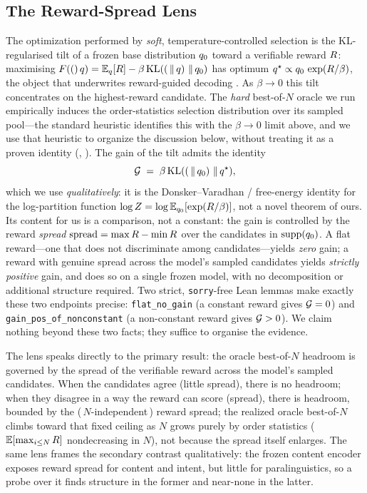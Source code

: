 \subsection{The Reward-Spread Lens}
\label{sec:res:lens}

The optimization performed by \emph{soft}, temperature-controlled selection is the KL-regularised tilt of a frozen base distribution $q_{0}$ toward a verifiable reward $R$: maximising $F\!\left((\right)q)=\mathbb{E}_{q}[R]-\beta\,\mathrm{KL}\!\left(( \,\|\, q\right)\,\|\,q_{0})$ has optimum $q^{\star} \propto q_{0}\,\exp(R/\beta)$, the object that underwrites reward-guided decoding \citep{korbak2022kl,mudgal2024controlled,beirami2024bon}. As $\beta\!\to\!0$ this tilt concentrates on the highest-reward candidate. The \emph{hard} best-of-$N$ oracle we run empirically induces the order-statistics selection distribution over its sampled pool---the standard heuristic identifies this with the $\beta\to0$ limit above, and we use that heuristic to organize the discussion below, without treating it as a proven identity (, ). The gain of the tilt admits the identity
\[
  \mathcal{G} \;=\; \beta\,\mathrm{KL}\!\left(( \,\|\, q_{0}\right)\,\|\,q^{\star}),
\]
which we use \emph{qualitatively}: it is the Donsker--Varadhan / free-energy identity for the log-partition function $\log Z=\log\mathbb{E}_{q_{0}}[\exp(R/\beta)]$, not a novel theorem of ours. Its content for us is a comparison, not a constant: the gain is controlled by the reward \emph{spread} $\mathrm{spread}=\max R-\min R$ over the candidates in $\mathrm{supp}(q_{0})$. A flat reward---one that does not discriminate among candidates---yields \emph{zero} gain; a reward with genuine spread across the model's sampled candidates yields \emph{strictly positive} gain, and does so on a single frozen model, with no decomposition or additional structure required. Two strict, \texttt{sorry}-free Lean lemmas make exactly these two endpoints precise: \texttt{flat\_no\_gain} (a constant reward gives $\mathcal{G}=0$) and \texttt{gain\_pos\_of\_nonconstant} (a non-constant reward gives $\mathcal{G}>0$). We claim nothing beyond these two facts; they suffice to organise the evidence.

The lens speaks directly to the primary result: the oracle best-of-$N$ headroom is governed by the spread of the verifiable reward across the model's sampled candidates. When the candidates agree (little spread), there is no headroom; when they disagree in a way the reward can score (spread), there is headroom, bounded by the (\,$N$-independent\,) reward spread; the realized oracle best-of-$N$ climbs toward that fixed ceiling as $N$ grows purely by order statistics ($\mathbb{E}[\max_{i\le N}R]$ nondecreasing in $N$), not because the spread itself enlarges. The same lens frames the secondary contrast qualitatively: the frozen content encoder exposes reward spread for content and intent, but little for paralinguistics, so a probe over it finds structure in the former and near-none in the latter.

